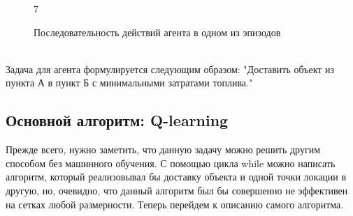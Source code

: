 \documentclass[a4paper]{report}
\theoremstyle{definition}
\theoremstyle{plain}
\theoremstyle{remark}
\theoremstyle{remark}
\theoremstyle{definition}
\begin{document}
\begin{figure}[H]
\begin{minipage}[H]{0.24\linewidth}
    \end{minipage}
    \begin{minipage}[H]{0.24\linewidth}
         7\\
    \end{minipage}
    \caption{Последовательность действий агента в одном из эпизодов}
    \label{fig:my_label}
\end{figure}
\\
Задача для агента формулируется следующим образом: "Доставить объект из пункта А в пункт Б с минимальными затратами топлива."
\begin{center}
    \subsection{Основной алгоритм: Q-learning}
\end{center}

Прежде всего, нужно заметить, что данную задачу можно решить другим способом без машинного обучения. С помощью цикла while можно написать алгоритм, который реализовывал бы доставку объекта и одной точки локации в другую, но, очевидно, что данный алгоритм был бы совершенно не эффективен на сетках любой размерности. Теперь перейдем к описанию самого алгоритма. \\
\end{document}
